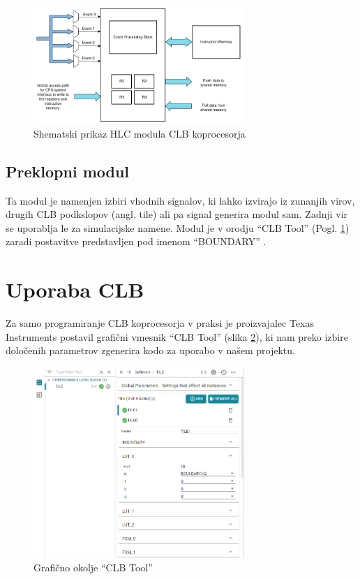 \documentclass[a4paper]{article}
\begin{document}
\begin{figure}[htb]
    \centerline{\includegraphics[width=8cm]{shema_hlc}}
    \caption{Shematski prikaz HLC modula CLB koprocesorja \cite[Pogl.~26.4.6]{mcu-ref-manual}}
    \label{fig:hlc} 
\end{figure}

\subsection{Preklopni modul}
Ta modul je namenjen izbiri vhodnih signalov, ki lahko izvirajo iz zunanjih virov, drugih CLB podkslopov (angl. tile) ali pa signal generira modul sam. Zadnji vir se uporablja le za simulacijske namene. Modul je v orodju ``CLB Tool'' (Pogl. \ref{sec:clb_tool}) zaradi postavitve predstavljen pod imenom ``BOUNDARY'' \cite[Pogl.~3.3]{clb-user-guide}.



\section{Uporaba CLB}\label{sec:clb_tool}
Za samo programiranje CLB koprocesorja v praksi je proizvajalec Texas Instruments postavil grafični vmesnik ``CLB Tool'' (slika \ref{fig:clbtool}), ki nam preko izbire določenih parametrov zgenerira kodo za uporabo v našem projektu.

\begin{figure}[htb]
    \centerline{\includegraphics[width=8cm]{clbtool}}
    \caption{Grafično okolje ``CLB Tool''}
    \label{fig:clbtool} 
\end{figure} 
\end{document}
